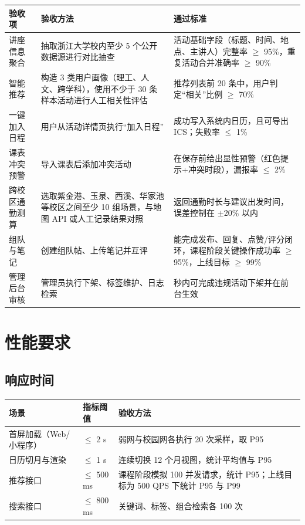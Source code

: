 \documentclass[UTF8,a4paper,12pt,fontset=none]{ctexrep}
\begin{document}
\begingroup
\small
\begin{longtable}{|>{\raggedright\arraybackslash}p{}|>{\raggedright\arraybackslash}p{}|>{\raggedright\arraybackslash}p{}|}
\hline
\textbf{验收项} & \textbf{验收方法} & \textbf{通过标准} \\
\hline
讲座信息聚合 & 抽取浙江大学校内至少 5 个公开数据源进行对比抽查 & 活动基础字段（标题、时间、地点、主讲人）完整率 $\geq$ 95\%，重复活动合并准确率 $\geq$ 90\% \\
\hline
智能推荐 & 构造 3 类用户画像（理工、人文、跨学科），使用不少于 30 条样本活动进行人工相关性评估 & 推荐列表前 20 条中，用户判定“相关”比例 $\geq$ 70\% \\
\hline
一键加入日程 & 用户从活动详情页执行“加入日程” & 成功写入系统内日历，且可导出 ICS；失败率 $\leq$ 1\% \\
\hline
课表冲突预警 & 导入课表后添加冲突活动 & 在保存前给出显性预警（红色提示+冲突时段），漏报率 $\leq$ 2\% \\
\hline
跨校区通勤测算 & 选取紫金港、玉泉、西溪、华家池等校区之间至少 10 组场景，与地图 API 或人工记录结果对照 & 返回通勤时长与建议出发时间，误差控制在 $\pm$20\% 以内 \\
\hline
组队与笔记 & 创建组队帖、上传笔记并互评 & 能完成发布、回复、点赞/评分闭环，课程阶段关键操作成功率 $\geq$ 95\%，上线目标 $\geq$ 99\% \\
\hline
管理后台审核 & 管理员执行下架、标签维护、日志检索 & 30 秒内可完成违规活动下架并在前台生效 \\
\hline
\end{longtable}
\endgroup

\section{性能要求}

\subsection{响应时间}

\begingroup
\small
\begin{longtable}{|>{\raggedright\arraybackslash}p{}|>{\raggedright\arraybackslash}p{}|>{\raggedright\arraybackslash}p{}|}
\hline
\textbf{场景} & \textbf{指标阈值} & \textbf{验收方法} \\
\hline
首屏加载（Web/小程序） & $\leq$ 2 s & 弱网与校园网各执行 20 次采样，取 P95 \\
\hline
日历切月与渲染 & $\leq$ 1 s & 连续切换 12 个月视图，统计平均值与 P95 \\
\hline
推荐接口 & $\leq$ 500 ms & 课程阶段模拟 100 并发请求，统计 P95；上线目标为 500 QPS 下统计 P95 与 P99 \\
\hline
搜索接口 & $\leq$ 800 ms & 关键词、标签、组合检索各 100 次 \\
\hline
\end{longtable}
\endgroup
\end{document}
